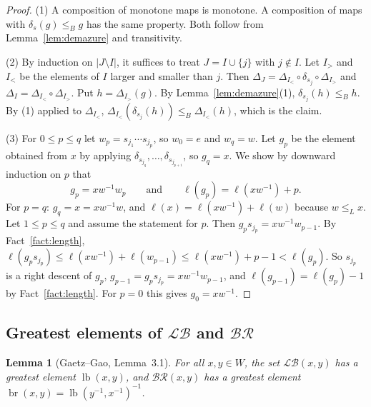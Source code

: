 \documentclass[11pt]{amsart}
\newtheorem{lemma}[theorem]{Lemma}
\theoremstyle{definition}
\theoremstyle{remark}
\numberwithin{equation}{section}
\newcommand{\LB}{\mathcal{LB}}
\newcommand{\BR}{\mathcal{BR}}
\newcommand{\leL}{\le_L}
\newcommand{\leB}{\le_B}
\newcommand{\abs}[1]{\lvert #1\rvert}
\DeclareMathOperator{\lb}{lb}
\DeclareMathOperator{\br}{br}
\begin{document}
\begin{proof}
(1) A composition of monotone maps is monotone. A composition of maps with \(\delta_s(g)\leB g\) has the same property. Both follow from Lemma~\ref{lem:demazure} and transitivity.

(2) By induction on \(\abs{J\setminus I}\), it suffices to treat \(J=I\cup\{j\}\) with \(j\notin I\). Let \(I_>\) and \(I_<\) be the elements of \(I\) larger and smaller than \(j\). Then \(\Delta_J=\Delta_{I_<}\circ\delta_{s_j}\circ\Delta_{I_>}\) and \(\Delta_I=\Delta_{I_<}\circ\Delta_{I_>}\). Put \(h=\Delta_{I_>}(g)\). By Lemma~\ref{lem:demazure}(1), \(\delta_{s_j}(h)\leB h\). By (1) applied to \(\Delta_{I_<}\), \(\Delta_{I_<}(\delta_{s_j}(h))\leB\Delta_{I_<}(h)\), which is the claim.

(3) For \(0\le p\le q\) let \(w_p=s_{j_1}\cdots s_{j_p}\), so \(w_0=e\) and \(w_q=w\). Let \(g_p\) be the element obtained from \(x\) by applying \(\delta_{s_{j_q}},\dots,\delta_{s_{j_{p+1}}}\), so \(g_q=x\). We show by downward induction on \(p\) that
\[
g_p=xw^{-1}w_p\qquad\text{and}\qquad\ell(g_p)=\ell(xw^{-1})+p.
\]
For \(p=q\): \(g_q=x=xw^{-1}w\), and \(\ell(x)=\ell(xw^{-1})+\ell(w)\) because \(w\leL x\). Let \(1\le p\le q\) and assume the statement for \(p\). Then \(g_ps_{j_p}=xw^{-1}w_{p-1}\). By Fact~\ref{fact:length}, \(\ell(g_ps_{j_p})\le\ell(xw^{-1})+\ell(w_{p-1})\le\ell(xw^{-1})+p-1<\ell(g_p)\). So \(s_{j_p}\) is a right descent of \(g_p\), \(g_{p-1}=g_ps_{j_p}=xw^{-1}w_{p-1}\), and \(\ell(g_{p-1})=\ell(g_p)-1\) by Fact~\ref{fact:length}. For \(p=0\) this gives \(g_0=xw^{-1}\).
\end{proof}

\subsection{Greatest elements of \texorpdfstring{\(\LB\)}{LB} and \texorpdfstring{\(\BR\)}{BR}}

\begin{lemma}[Gaetz--Gao, Lemma~3.1]\label{lem:lb}
For all \(x,y\in W\), the set \(\LB(x,y)\) has a greatest element \(\lb(x,y)\), and \(\BR(x,y)\) has a greatest element \(\br(x,y)=\lb(y^{-1},x^{-1})^{-1}\).
\end{lemma}
\end{document}
